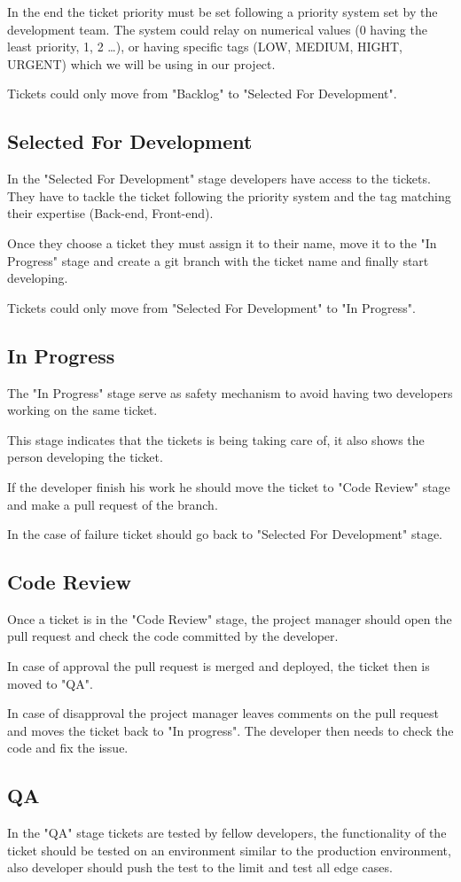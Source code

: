 \begin{spacing}{1.2}
In the end the ticket priority must be set following a priority system set by the development team. The system could relay on numerical values (0 having the least priority, 1, 2 \dots), or having specific tags (LOW, MEDIUM, HIGHT, URGENT) which we will be using in our project.

Tickets could only move from "Backlog" to "Selected For Development".
\subsection{Selected For Development}
In the "Selected For Development" stage developers have access to the tickets. They have to tackle the ticket following the priority system and the tag matching their expertise (Back-end, Front-end).

Once they choose a ticket they must assign it to their name, move it to the "In Progress" stage and create a git branch with the ticket name and finally start developing.

Tickets could only move from "Selected For Development" to "In Progress".
\subsection{In Progress}
The "In Progress" stage serve as safety mechanism to avoid having two developers working on the same ticket.

This stage indicates that the tickets is being taking care of, it also shows the person developing the ticket.

If the developer finish his work he should move the ticket to "Code Review" stage and make a pull request of the branch.


In the case of failure ticket should go back to "Selected For Development" stage.
\subsection{Code Review}
Once a ticket is in the "Code Review" stage, the project manager should open the pull request and check the code committed by the developer.

In case of approval the pull request is merged and deployed, the ticket then is moved to "QA".


In case of disapproval the project manager leaves comments on the pull request and moves the ticket back to "In progress". The developer then needs to check the code and fix the issue.
\subsection{QA}
In the "QA" stage tickets are tested by fellow developers, the functionality of the ticket should be tested on an environment similar to the production environment, also developer should push the test to the limit and test all edge cases.


\end{spacing}
